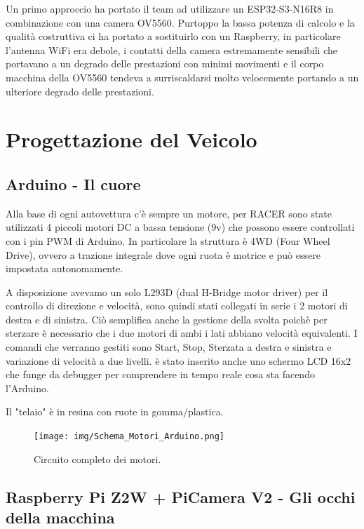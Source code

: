 \documentclass{article}
\begin{document}
    Un primo approccio ha portato il team ad utilizzare un ESP32-S3-N16R8 in combinazione con una camera OV5560. Purtoppo la bassa potenza di calcolo e la qualità costruttiva ci ha portato a sostituirlo con un Raspberry, in particolare l'antenna WiFi era debole, i contatti della camera estremamente sensibili che portavano a un degrado delle prestazioni con minimi movimenti e il corpo macchina della OV5560 tendeva a surriscaldarsi molto velocemente portando a un ulteriore degrado delle prestazioni.


\section{Progettazione del Veicolo}

\subsection{Arduino - Il cuore}

Alla base di ogni autovettura c'è sempre un motore, per RACER sono state utilizzati 4 piccoli motori DC a bassa tensione (9v) che possono essere controllati con i pin PWM di Arduino. In particolare la struttura è 4WD (Four Wheel Drive), ovvero a trazione integrale dove ogni ruota è motrice e può essere impostata autonomamente.

A disposizione avevamo un solo L293D (dual H-Bridge motor driver) per il controllo di direzione e velocità, sono quindi stati collegati in serie i 2 motori di destra e di sinistra. Ciò semplifica anche la gestione della svolta poichè per sterzare è necessario che i due motori di ambi i lati abbiano velocità equivalenti. I comandi che verranno gestiti sono Start, Stop, Sterzata a destra e sinistra e variazione di velocità a due livelli.
è stato inserito anche uno schermo LCD 16x2 che funge da debugger per comprendere in tempo reale cosa sta facendo l'Arduino.

Il "telaio" è in resina con ruote in gomma/plastica.



\begin{figure}[h!]
\centering
\texttt{[image: img/Schema\_Motori\_Arduino.png]}
\caption{Circuito completo dei motori.}
\end{figure}


\subsection{Raspberry Pi Z2W + PiCamera V2 - Gli occhi della macchina}
\end{document}
